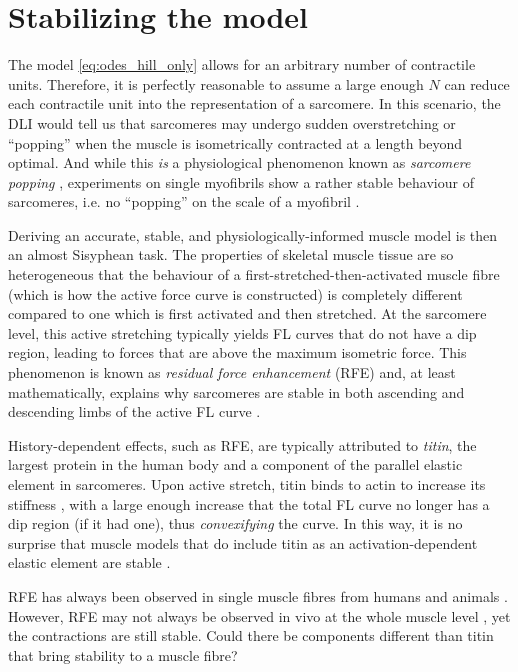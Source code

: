 \documentclass{sfuthesis}
\numberwithin{equation}{section}
\numberwithin{figure}{chapter}
\numberwithin{table}{chapter}
\theoremstyle{definition}
\begin{document}
\section{Stabilizing the model} \label{sec:stabilizing_the_model_ch3}

The model \eqref{eq:odes_hill_only} allows for an arbitrary number of contractile units. Therefore, it is perfectly reasonable to assume a large enough $N$ can reduce each contractile unit into the representation of a sarcomere. In this scenario, the DLI would tell us that sarcomeres may undergo sudden overstretching or ``popping'' when the muscle is isometrically contracted at a length beyond optimal. And while this \textit{is} a physiological phenomenon known as \textit{sarcomere popping} \cite{Morgan1990,MorganProske2004,MorganProske2006}, experiments on single myofibrils show a rather stable behaviour of sarcomeres, i.e. no ``popping'' on the scale of a myofibril \cite{JohnstonJinhaHerzog2016}.

Deriving an accurate, stable, and physiologically-informed muscle model is then an almost Sisyphean task. The properties of skeletal muscle tissue are so heterogeneous that the behaviour of a first-stretched-then-activated muscle fibre (which is how the active force curve is constructed) is completely different compared to one which is first activated and then stretched. At the sarcomere level, this active stretching typically yields FL curves that do not have a dip region, leading to forces that are above the maximum isometric force. This phenomenon is known as \textit{residual force enhancement} (RFE) and, at least mathematically, explains why sarcomeres are stable in both ascending and descending limbs of the active FL curve \cite{JoumaaLeonardHerzog2008}. 

History-dependent effects, such as RFE, are typically attributed to \textit{titin}, the largest protein in the human body and a component of the parallel elastic element in sarcomeres. Upon active stretch, titin binds to actin to increase its stiffness \cite{Nishikawa2020}, with a large enough increase that the total FL curve no longer has a dip region (if it had one), thus \textit{convexifying} the curve. In this way, it is no surprise that muscle models that do include titin as an activation-dependent elastic element are stable \cite{HeidlaufEtAl2016,HeidlaufEtAl2017,LemosEtAl2001,Millard2024,SampaioDeOliveiraUchida2025}. 

RFE has always been observed in single muscle fibres from humans and animals \cite{JoumaaLeonardHerzog2008, Pinnell2019,RassierPavlov2012}. However, RFE may not always be observed in vivo at the whole muscle level \cite{Bakenecker2020,Chapman2018,Hinks2024}, yet the contractions are still stable. Could there be components different than titin that bring stability to a muscle fibre?
\end{document}
